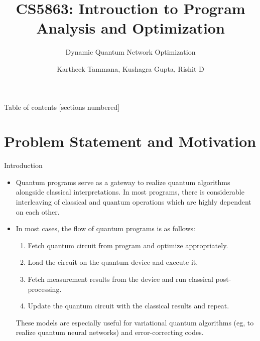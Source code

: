 \documentclass[10pt]{beamer}
\title{CS5863: Introuction to Program Analysis and Optimization}
\subtitle{Dynamic Quantum Network Optimization}
\date{}
\author{Kartheek Tammana, Kushagra Gupta, Rishit D}
\institute{Indian Institute of Technology, Hyderabad}
\begin{document}
\maketitle

\begin{frame}{Table of contents}
  [sections numbered]
  \tableofcontents[hideallsubsections]
\end{frame}


\section[Problem Statement]{Problem Statement and Motivation}


\begin{frame}{Introduction}
  \begin{itemize}
    \item Quantum programs serve as a gateway to realize quantum algorithms alongside classical interpretations. In most programs, there is considerable interleaving of classical and quantum operations which are highly dependent on each other.

      \pause

    \item In most cases, the flow of quantum programs is as follows:
      \begin{enumerate}
        \item Fetch quantum circuit from program and optimize appropriately.
        \item Load the circuit on the quantum device and execute it.
        \item Fetch measurement results from the device and run classical post-processing.
        \item Update the quantum circuit with the classical results and repeat.
      \end{enumerate}
      These models are especially useful for variational quantum algorithms (eg, to realize quantum neural networks) and error-correcting codes.

  \end{itemize}
\end{frame}

\end{document}
